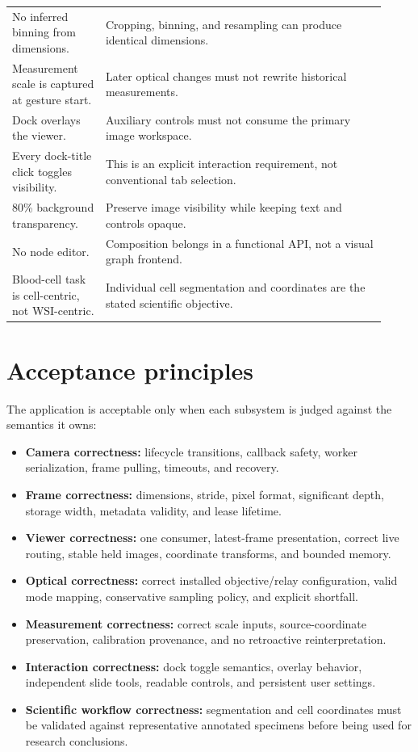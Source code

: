 \documentclass[11pt,a4paper,oneside]{article}
\begin{document}
\begin{longtable}{p{0.23\linewidth}p{0.69\linewidth}}
No inferred binning from dimensions. & Cropping, binning, and resampling can produce identical dimensions.\\
Measurement scale is captured at gesture start. & Later optical changes must not rewrite historical measurements.\\
Dock overlays the viewer. & Auxiliary controls must not consume the primary image workspace.\\
Every dock-title click toggles visibility. & This is an explicit interaction requirement, not conventional tab selection.\\
80\% background transparency. & Preserve image visibility while keeping text and controls opaque.\\
No node editor. & Composition belongs in a functional API, not a visual graph frontend.\\
Blood-cell task is cell-centric, not WSI-centric. & Individual cell segmentation and coordinates are the stated scientific objective.\\
\bottomrule
\end{longtable}

\section{Acceptance principles}

The application is acceptable only when each subsystem is judged against the semantics it owns:
\begin{itemize}
  \item \textbf{Camera correctness:} lifecycle transitions, callback safety, worker serialization, frame pulling, timeouts, and recovery.
  \item \textbf{Frame correctness:} dimensions, stride, pixel format, significant depth, storage width, metadata validity, and lease lifetime.
  \item \textbf{Viewer correctness:} one consumer, latest-frame presentation, correct live routing, stable held images, coordinate transforms, and bounded memory.
  \item \textbf{Optical correctness:} correct installed objective/relay configuration, valid mode mapping, conservative sampling policy, and explicit shortfall.
  \item \textbf{Measurement correctness:} correct scale inputs, source-coordinate preservation, calibration provenance, and no retroactive reinterpretation.
  \item \textbf{Interaction correctness:} dock toggle semantics, overlay behavior, independent slide tools, readable controls, and persistent user settings.
  \item \textbf{Scientific workflow correctness:} segmentation and cell coordinates must be validated against representative annotated specimens before being used for research conclusions.
\end{itemize}
\end{document}
